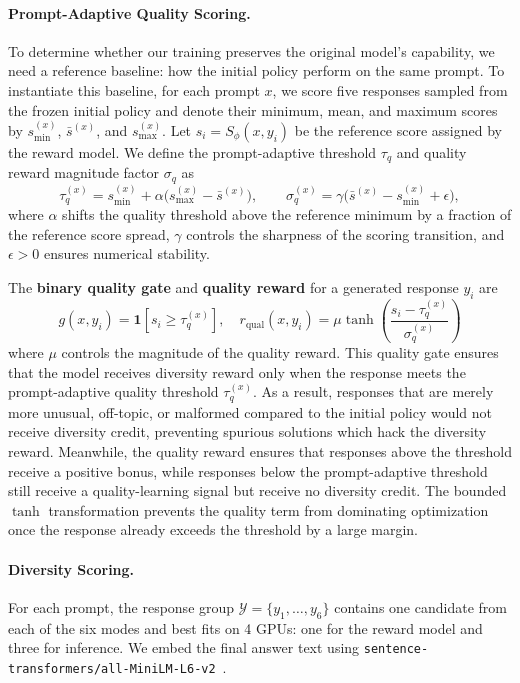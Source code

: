 \paragraph{Prompt-Adaptive Quality Scoring.}
To determine whether our training preserves the original model's capability, we need a reference baseline: how the initial policy perform on the same prompt. To instantiate this baseline, for each prompt $x$, we score five responses sampled from the frozen initial policy and denote their minimum, mean, and maximum scores by $s_{\min}^{(x)}$, $\bar{s}^{(x)}$, and $s_{\max}^{(x)}$. Let $s_i=S_\phi(x,y_i)$ be the reference score assigned by the reward model. We define the prompt-adaptive threshold  $\tau_q$ and quality reward magnitude factor $\sigma_q$ as
\begin{equation}
    \tau_q^{(x)} = s_{\min}^{(x)} + \alpha \bigl(s_{\max}^{(x)} - \bar{s}^{(x)}\bigr),
    \qquad
    \sigma_q^{(x)} = \gamma \bigl(\bar{s}^{(x)} - s_{\min}^{(x)} + \epsilon\bigr),
\end{equation}
where $\alpha$ shifts the quality threshold above the reference minimum by a fraction of the reference score spread, $\gamma$ controls the sharpness of the scoring transition, and $\epsilon > 0$ ensures numerical stability.

The \textbf{binary quality gate} and\textbf{ quality reward}  for a generated response $y_i$ are
\begin{equation}
g(x, y_i) = \mathbf{1}\!\left[s_i \geq \tau_q^{(x)}\right]
,
\quad
    r_{\mathrm{qual}}(x, y_i)
    =
    \mu \tanh\!\left(
    \frac{s_i - \tau_q^{(x)}}{\sigma_q^{(x)}}
    \right)
\end{equation}
where $\mu$ controls the magnitude of the quality reward. This quality gate ensures that the model receives diversity reward only when the response meets the prompt-adaptive quality threshold $\tau_q^{(x)}$. As a result, responses that are merely more unusual, off-topic, or malformed compared to the initial policy would not receive diversity credit, preventing spurious solutions which hack the diversity reward.
Meanwhile, the quality reward ensures that responses above the threshold receive a positive bonus, while responses below the prompt-adaptive threshold still receive a quality-learning signal but receive no diversity credit. The bounded $\tanh$ transformation prevents the quality term from dominating optimization once the response already exceeds the threshold by a large margin. 

\paragraph{Diversity Scoring.}
For each prompt, the response group 
$\mathcal{Y}=\{y_1,\ldots,y_6\}$ contains one candidate from each of the six modes and best fits on 4 GPUs: one for the reward model and three for inference. We embed the final answer text using
\texttt{sentence-transformers/all-MiniLM-L6-v2}~\citep{wang2020minilmdeepselfattentiondistillation}.

